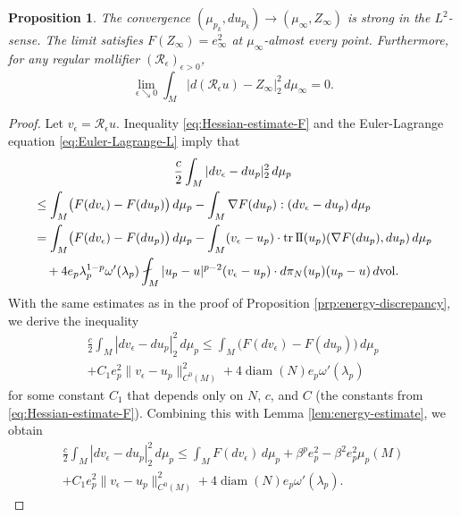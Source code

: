 \documentclass[10pt,a4paper]{amsart}
\newcommand{\vol}{\mathrm{vol}}
\newcommand{\sff}{\mathrm{I{\mkern -1mu}I}}
\DeclareMathOperator{\tr}{tr}
\DeclareMathOperator{\diam}{diam}
\newtheorem{proposition}[theorem]{Proposition}
\begin{document}
\begin{proposition} \label{prp:strong-convergence}
The convergence $(\mu_{p_k}, du_{p_k}) \to (\mu_\infty, Z_\infty)$ is strong in the $L^2$- sense. The limit satisfies $F(Z_\infty) = e_\infty^2$ at $\mu_\infty$-almost every point. Furthermore, for any regular mollifier $(\mathcal{R}_\epsilon)_{\epsilon > 0}$,
\[
\lim_{\epsilon \searrow 0} \int_M |d(\mathcal{R}_\epsilon u) - Z_\infty|_2^2 \, d\mu_\infty = 0.
\]
\end{proposition}

\begin{proof}
Let $v_\epsilon = \mathcal{R}_\epsilon u$. Inequality \eqref{eq:Hessian-estimate-F} and the Euler-Lagrange equation \eqref{eq:Euler-Lagrange-L} imply that
\begin{multline*}
\frac{c}{2} \int_M |dv_\epsilon - du_p|_2^2 \, d\mu_p \\
\begin{aligned}
& \le \int_M \bigl(F(dv_\epsilon) - F(du_p)\bigr) \, d\mu_p - \int_M \nabla F(du_p) : (dv_\epsilon - du_p) \, d\mu_p \\
& = \int_M \bigl(F(dv_\epsilon) - F(du_p)\bigr) \, d\mu_p - \int_M (v_\epsilon - u_p) \cdot \tr \sff(u_p)(\nabla F(du_p), du_p) \, d\mu_p \\
& \quad + 4 e_p \lambda_p^{1 - p} \omega'(\lambda_p) \fint_M |u_p - u|^{p - 2} (v_\epsilon - u_p) \cdot d\pi_N(u_p)(u_p - u) \, d\vol.
\end{aligned}
\end{multline*}
With the same estimates as in the proof of Proposition \ref{prp:energy-discrepancy},
we derive the inequality
\begin{multline*}
\frac{c}{2} \int_M |dv_\epsilon - du_p|_2^2 \, d\mu_p \le \int_M \bigl(F(dv_\epsilon) - F(du_p)\bigr) \, d\mu_p \\
+ C_1 e_p^2 \|v_\epsilon - u_p\|_{C^0(M)}^2 + 4\diam(N) e_p \omega'(\lambda_p)
\end{multline*}
for some constant $C_1$ that depends only on $N$, $c$, and $C$ (the constants from \eqref{eq:Hessian-estimate-F}).
Combining this with Lemma \ref{lem:energy-estimate}, we obtain
\begin{multline*}
\frac{c}{2} \int_M |dv_\epsilon - du_p|_2^2 \, d\mu_p \le \int_M F(dv_\epsilon) \, d\mu_p + \beta^p e_p^2 - \beta^2 e_p^2 \mu_p(M) \\
+ C_1 e_p^2 \|v_\epsilon - u_p\|_{C^0(M)}^2 + 4 \diam(N) e_p \omega'(\lambda_p).
\end{multline*}


\end{proof}
\end{document}
